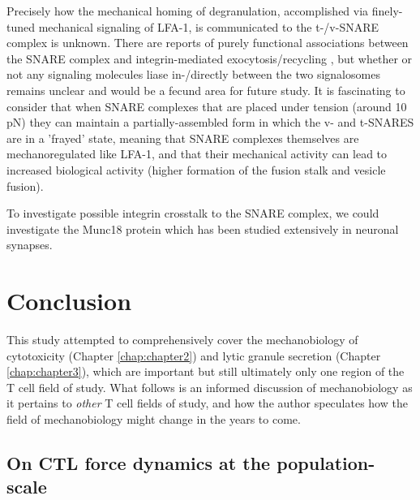 Precisely how the mechanical homing of degranulation, accomplished via finely-tuned mechanical signaling of LFA-1, is communicated to the t-/v-SNARE complex is unknown.  There are reports of purely functional associations between the SNARE complex and integrin-mediated exocytosis/recycling \cite{Riggs2012, Zhuang2020}, but whether or not any signaling molecules liase in-/directly between the two signalosomes remains unclear and would be a fecund area for future study. It is fascinating to consider that when SNARE complexes that are placed under tension (around 10 pN) they can maintain a partially-assembled form in which the v- and t-SNARES are in a 'frayed' state, meaning that SNARE complexes themselves are mechanoregulated like LFA-1, and that their mechanical activity can lead to increased biological activity (higher formation of the fusion stalk and vesicle fusion). 

To investigate possible integrin crosstalk to the SNARE complex, we could investigate the Munc18 protein which has been studied extensively in neuronal synapses. 

\section{Conclusion}

This study attempted to comprehensively cover the mechanobiology of cytotoxicity (Chapter \ref{chap:chapter2}) and lytic granule secretion (Chapter \ref{chap:chapter3}), which are important but still ultimately only one region of the T cell field of study. What follows is an informed discussion of mechanobiology as it pertains to \textit{other} T cell fields of study,  and how the author speculates how the field of mechanobiology might change in the years to come.

\subsection{On CTL force dynamics at the population-scale}

